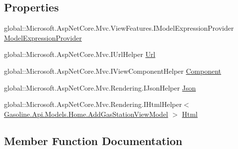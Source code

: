 \subsection*{Properties}
\begin{DoxyCompactItemize}
\item 
global\+::\+Microsoft.\+Asp\+Net\+Core.\+Mvc.\+View\+Features.\+I\+Model\+Expression\+Provider \mbox{\hyperlink{class_asp_net_core_1_1_views___home___add_gas_station_view_a7abb60dc633444ad410e8db5baaefad7}{Model\+Expression\+Provider}}
\item 
global\+::\+Microsoft.\+Asp\+Net\+Core.\+Mvc.\+I\+Url\+Helper \mbox{\hyperlink{class_asp_net_core_1_1_views___home___add_gas_station_view_a3da1af8de50ba567017b9d7becc0f9ee}{Url}}
\item 
global\+::\+Microsoft.\+Asp\+Net\+Core.\+Mvc.\+I\+View\+Component\+Helper \mbox{\hyperlink{class_asp_net_core_1_1_views___home___add_gas_station_view_abbe0887258cdb2477dac740d2f7651c0}{Component}}
\item 
global\+::\+Microsoft.\+Asp\+Net\+Core.\+Mvc.\+Rendering.\+I\+Json\+Helper \mbox{\hyperlink{class_asp_net_core_1_1_views___home___add_gas_station_view_a61074225cbaa6721f78a69b1fa2f76e2}{Json}}
\item 
global\+::\+Microsoft.\+Asp\+Net\+Core.\+Mvc.\+Rendering.\+I\+Html\+Helper$<$ \mbox{\hyperlink{class_gasoline_1_1_api_1_1_models_1_1_home_1_1_add_gas_station_view_model}{Gasoline.\+Api.\+Models.\+Home.\+Add\+Gas\+Station\+View\+Model}} $>$ \mbox{\hyperlink{class_asp_net_core_1_1_views___home___add_gas_station_view_a0f260a4cbd790e869a427200af113a2e}{Html}}
\end{DoxyCompactItemize}


\subsection{Member Function Documentation}
\mbox{\label{class_asp_net_core_1_1_views___home___add_gas_station_view_a3c8c80d96f17fa7e0cc6887dfd099552}} 
